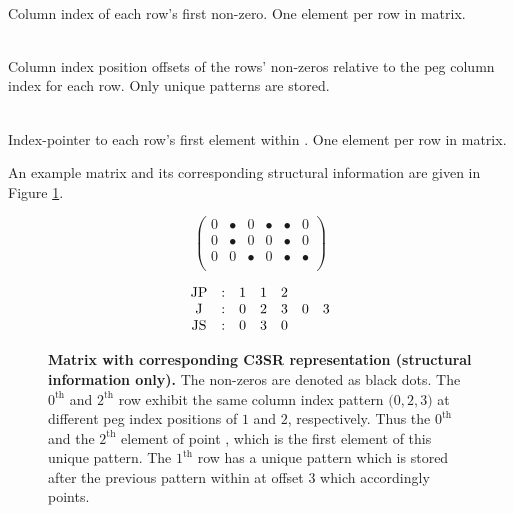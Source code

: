 \documentclass{article}
\begin{document}
    \begin{description}[align = left, labelwidth = 4cm]
      \item [JP - \emph{Peg column indices}] \hfill \\
        Column index of each row's first non-zero. One element per row in matrix.
      \item [J - \emph{Column index patterns}] \hfill \\
        Column index position offsets of the rows' non-zeros relative to the peg column index for each row. Only unique patterns are stored.
      \item [JS - \emph{Patterns' index-pointers}] \hfill \\
        Index-pointer to each row's first element within \J. One element per row in matrix.
    \end{description}

    An example matrix and its corresponding structural information are given in Figure \ref{fig:c3sr_example_structure}.

    \begin{figure}[ht]
      \centering
      \begin{minipage}{0.4\textwidth}
        \centering
        $$
        \begin{pmatrix}
          0 & \bullet & 0 & \bullet & \bullet & 0 \\
          0 & \bullet & 0 & 0 & \bullet & 0 \\
          0 & 0 & \bullet & 0 & \bullet & \bullet \\
        \end{pmatrix}
        $$
      \end{minipage}
      \begin{minipage}{0.4\textwidth}
        \centering
        $$
        \begin{matrix}
          \JP & : & 1 & 1 & 2 &   &   \\
           \J & : & 0 & 2 & 3 & 0 & 3 \\
          \JS & : & 0 & 3 & 0 &   &   \\
        \end{matrix}
        $$
      \end{minipage}
      \caption[Matrix with corresponding C3SR representation (structural information only).]{\textbf{Matrix with corresponding C3SR representation (structural information only).} The non-zeros are denoted as black dots. The $0^{\text{th}}$ and $2^{\text{th}}$ row exhibit the same column index pattern $\big(0,2,3\big)$ at different peg index positions of $1$ and $2$, respectively. Thus the $0^{\text{th}}$ and the $2^{\text{th}}$ element of \JS point \J[0], which is the first element of this unique pattern. The $1^{\text{th}}$ row has a unique pattern which is stored after the previous pattern within \J at offset $3$ which \JS[1] accordingly points.}
      \label{fig:c3sr_example_structure}
    \end{figure}
\end{document}

